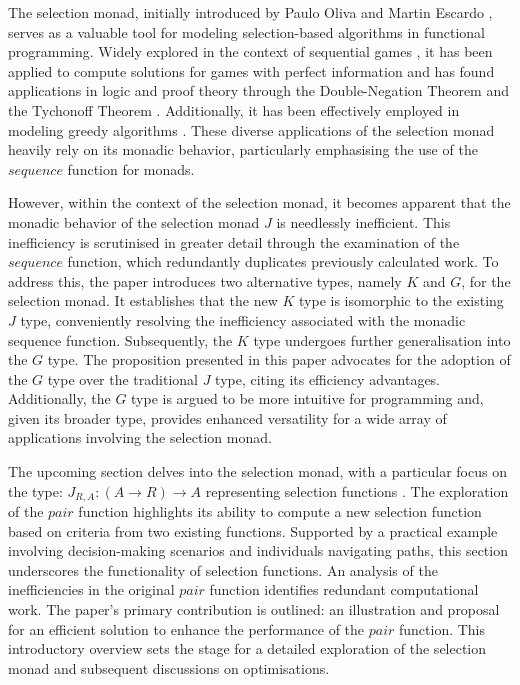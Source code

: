 \documentclass[runningheads]{llncs}
\begin{document}
The selection monad, initially introduced by Paulo Oliva and Martin
Escardo \cite{escardo2010selection}, serves as a valuable tool for
modeling selection-based algorithms in functional programming. Widely
explored in the context of sequential games
\cite{escardo2010sequential}, it has been applied to compute solutions
for games with perfect information and has found applications in logic
and proof theory through the Double-Negation Theorem and the Tychonoff
Theorem \cite{escardo2010sequential}. Additionally, it has been
effectively employed in modeling greedy algorithms
\cite{hartmann2022algorithm}. These diverse applications of the
selection monad heavily rely on its monadic behavior, particularly
emphasising the use of the \(sequence\) function for monads.

\qquad However, within the context of the selection monad, it becomes
apparent that the monadic behavior of the selection monad \(J\) is
needlessly inefficient. This inefficiency is scrutinised in greater
detail through the examination of the \(sequence\) function, which
redundantly duplicates previously calculated work. To address this, the
paper introduces two alternative types, namely \(K\) and \(G\), for the
selection monad. It establishes that the new \(K\) type is isomorphic to
the existing \(J\) type, conveniently resolving the inefficiency
associated with the monadic sequence function. Subsequently, the \(K\)
type undergoes further generalisation into the \(G\) type. The
proposition presented in this paper advocates for the adoption of the
\(G\) type over the traditional \(J\) type, citing its efficiency
advantages. Additionally, the \(G\) type is argued to be more intuitive
for programming and, given its broader type, provides enhanced
versatility for a wide array of applications involving the selection
monad.

\qquad The upcoming section delves into the selection monad, with a
particular focus on the type:
\(J_{R,A}:(A \rightarrow R) \rightarrow A\) representing selection
functions \cite{escardo2010selection}. The exploration of the \(pair\)
function highlights its ability to compute a new selection function
based on criteria from two existing functions. Supported by a practical
example involving decision-making scenarios and individuals navigating
paths, this section underscores the functionality of selection
functions. An analysis of the inefficiencies in the original \(pair\)
function identifies redundant computational work. The paper's primary
contribution is outlined: an illustration and proposal for an efficient
solution to enhance the performance of the \(pair\) function. This
introductory overview sets the stage for a detailed exploration of the
selection monad and subsequent discussions on optimisations.
\end{document}
